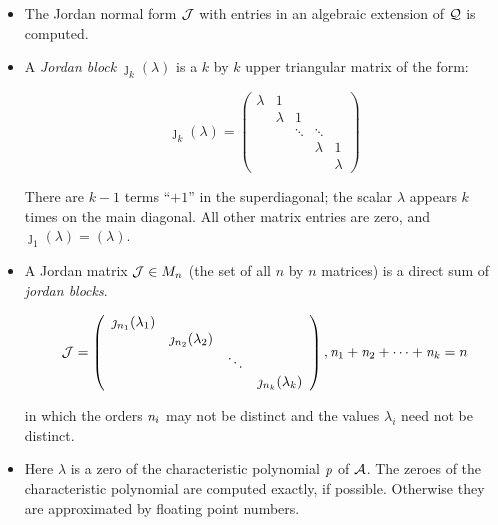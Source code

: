 \begin{itemize}
\item The Jordan normal form ${\cal J}$ with entries in an algebraic 
      extension of ${\cal Q}$ is computed.

\item A {\it Jordan block} ${\jmath}_{k}(\lambda)$ is a $k$ by $k$ 
      upper triangular matrix of the form:

      \begin{displaymath}
      {\jmath}_{k}(\lambda) = \left( \begin{array}{ccccc} \lambda & 1 
      &  &  & \\  &  \lambda & 1  & & \\ & 
      & \ddots & \ddots & \\ &  &  &  \lambda & 1 \\ &
      &  &  & \lambda \end{array} \right) 
      \end{displaymath}
      
      There are $k-1$ terms ``$+1$'' in the superdiagonal; the scalar 
      $\lambda$ appears $k$ times on the main diagonal. All other 
      matrix entries are zero, and ${\jmath}_{1}(\lambda) = (\lambda)$.

\item A Jordan matrix ${\cal J} \in M_{n}$ (the set of all $n$ by $n$ 
      matrices) is a direct sum of {\it jordan blocks}.

      \begin{displaymath}
      {\cal J} = \left( \begin{array}{cccc} \jmath_{n_1}(\lambda_{1}) 
      \\  & \jmath_{n_2}(\lambda_{2}) \\ & & \ddots \\ & & & 
      \jmath_{n_k}(\lambda_{k}) \end{array} \right),
      {\it n}_{1}+{\it n}_{2}+\cdots +{\it n}_{k} = n
      \end{displaymath}

      in which the orders ${\it n}_{i}$ may not be distinct and the 
      values ${\lambda_{i}}$ need not be distinct.

\item Here ${\lambda}$ is a zero of the characteristic polynomial 
      ${\it p}$ of ${\cal A}$. The zeroes of the characteristic 
      polynomial are computed exactly, if possible. Otherwise they are 
      approximated by floating point numbers.
\end{itemize}      

